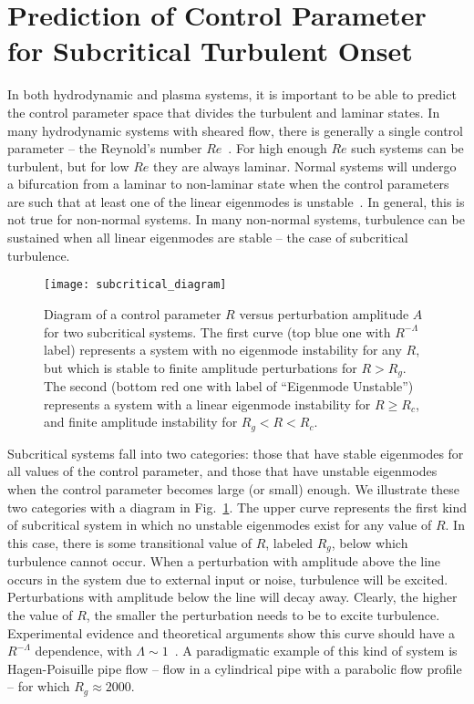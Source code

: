 \documentclass[letter,scriptaddress,twocolumn, prl,showkeys]{revtex4}
\begin{document}
\section{Prediction of Control Parameter for Subcritical Turbulent Onset}
\label{sec_subcrit_prediction}

In both hydrodynamic and plasma systems, it is important to be able to predict the control parameter space that divides the turbulent and laminar states.
In many hydrodynamic systems with sheared flow, there is generally a single control parameter -- the Reynold's number $Re$~\cite{drazin1981}. For high enough $Re$ such systems
can be turbulent, but for low $Re$ they are always laminar.
Normal systems will undergo a bifurcation from a laminar to non-laminar state when the control parameters are such that at least one of the linear eigenmodes is unstable~\cite{grossmann2000}.
In general, this is not true for non-normal systems. In many non-normal systems, turbulence can be sustained when all linear eigenmodes are stable -- the case of subcritical turbulence. 

\begin{figure}
\centerline{\texttt{[image: subcritical\_diagram]}}
\caption{Diagram of a control parameter $R$ versus perturbation amplitude $A$ for two subcritical systems. The first curve (top blue one with $R^{-\Lambda}$ label) represents a system with no
eigenmode instability for any $R$, but which is stable to finite amplitude perturbations for $R > R_g$. 
The second (bottom red one with label of ``Eigenmode Unstable'') represents a system with a linear eigenmode instability for $R \ge R_c$, and finite amplitude
instability for $R_g < R < R_c$.}
\label{subcritical_diagram}
\end{figure}

Subcritical systems fall into two categories: those that have stable eigenmodes for all values of the control parameter, and those that have unstable eigenmodes
when the control parameter becomes large (or small) enough. We illustrate these two categories with a diagram in Fig.~\ref{subcritical_diagram}. 
The upper curve represents the first kind of subcritical system in which no unstable eigenmodes exist for any value of $R$. In this
case, there is some transitional value of $R$, labeled $R_g$, below which turbulence cannot occur. When a perturbation with amplitude above the line occurs in the system due to external input or noise, 
turbulence will be excited. Perturbations with amplitude below the line will decay away. Clearly, the higher the value of $R$, the smaller the perturbation needs to be to excite turbulence.
Experimental evidence and theoretical arguments show this curve should have a $R^{-\Lambda}$ dependence, with $\Lambda \sim 1$~\cite{grossmann2000}.
A paradigmatic example of this kind of system is Hagen-Poisuille pipe flow -- flow in a cylindrical pipe with a parabolic flow profile -- for which $R_g \approx 2000$.
\end{document}
